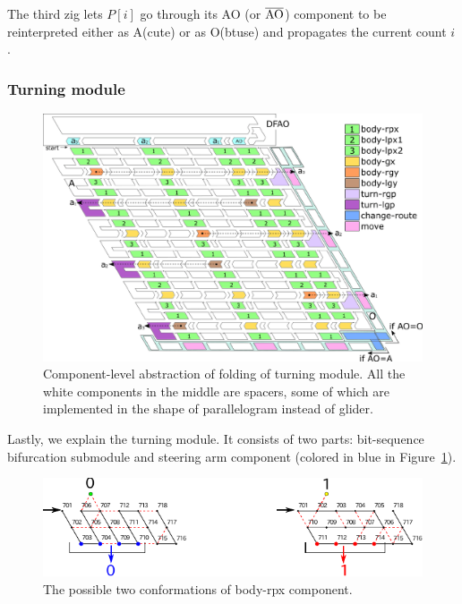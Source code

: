 The third zig lets $P[i]$ go through its AO (or $\overline{\rm AO}$) component to be reinterpreted either as A(cute) or as O(btuse) and propagates the current count $i$.   

			\subsubsection{Turning module}

\begin{figure}[t]
\centering
\includegraphics[width=\linewidth]{pic/overall_turn_part.pdf}
\caption{
Component-level abstraction of folding of turning module.
All the white components in the middle are spacers, some of which are implemented in the shape of parallelogram instead of glider. 
 }
\label{fig:overall_turning}
\end{figure}

Lastly, we explain the turning module. 
It consists of two parts: bit-sequence bifurcation submodule and steering arm component (colored in blue in Figure~\ref{fig:overall_turning}). 

\begin{figure}[h]
\centering
\includegraphics[width=0.8\linewidth]{pic/body-rpx.pdf}
\caption{The possible two conformations of body-rpx component.}
\label{fig:body-rpx}
\end{figure}


